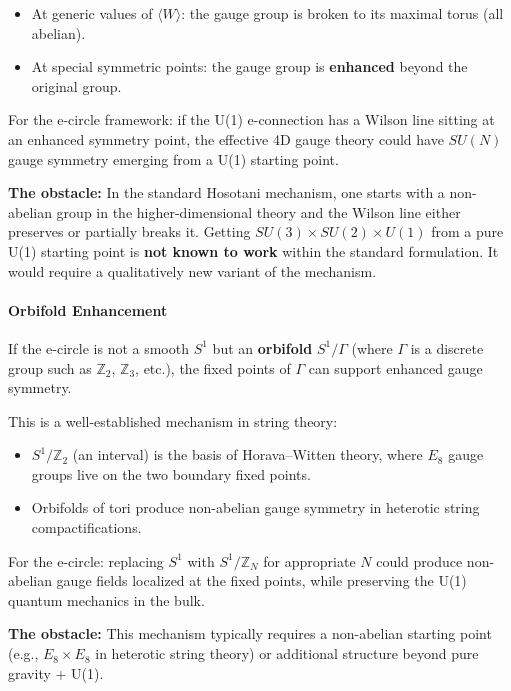 \documentclass[aps,prd,preprint,superscriptaddress,longbibliography,floatfix]{revtex4-2}
\theoremstyle{remark}
\begin{document}
\begin{itemize}
  \item At generic values of $\langle W \rangle$: the gauge group is broken to its maximal torus (all abelian).
  \item At special symmetric points: the gauge group is \textbf{enhanced} beyond the original group.
\end{itemize}

For the e-circle framework: if the U(1) e-connection has a Wilson line sitting at an enhanced symmetry point, the effective 4D gauge theory could have $SU(N)$ gauge symmetry emerging from a U(1) starting point.

\textbf{The obstacle:} In the standard Hosotani mechanism, one starts with a non-abelian group in the higher-dimensional theory and the Wilson line either preserves or partially breaks it. Getting $SU(3) \times SU(2) \times U(1)$ from a pure U(1) starting point is \textbf{not known to work} within the standard formulation. It would require a qualitatively new variant of the mechanism.


\paragraph{Orbifold Enhancement}

If the e-circle is not a smooth $S^1$ but an \textbf{orbifold} $S^1 / \Gamma$ (where $\Gamma$ is a discrete group such as $\mathbb{Z}_2$, $\mathbb{Z}_3$, etc.), the fixed points of $\Gamma$ can support enhanced gauge symmetry.

This is a well-established mechanism in string theory:

\begin{itemize}
  \item $S^1 / \mathbb{Z}_2$ (an interval) is the basis of Horava--Witten theory, where $E_8$ gauge groups live on the two boundary fixed points.
  \item Orbifolds of tori produce non-abelian gauge symmetry in heterotic string compactifications.
\end{itemize}

For the e-circle: replacing $S^1$ with $S^1 / \mathbb{Z}_N$ for appropriate $N$ could produce non-abelian gauge fields localized at the fixed points, while preserving the U(1) quantum mechanics in the bulk.

\textbf{The obstacle:} This mechanism typically requires a non-abelian starting point (e.g., $E_8 \times E_8$ in heterotic string theory) or additional structure beyond pure gravity + U(1).
\end{document}

